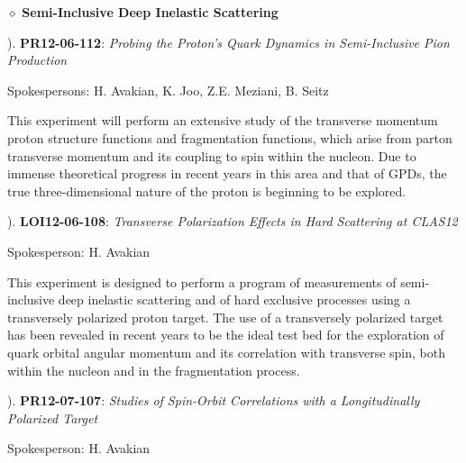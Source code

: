\vskip 0.5cm

\noindent
\begin{large}
$\diamond$ {\bf Semi-Inclusive Deep Inelastic Scattering}
\end{large}

\vskip 0.3cm

\begin{small}
). {\bf PR12-06-112}: {\it Probing the Proton's Quark Dynamics in
Semi-Inclusive Pion Production}

\vskip 0.2cm

\begin{footnotesize}
Spokespersons: H. Avakian, K. Joo, Z.E. Meziani, B. Seitz
\end{footnotesize}

\vskip 0.2cm

This experiment will perform an extensive study of the transverse 
momentum proton structure functions and fragmentation functions, which
arise from parton transverse momentum and its coupling to spin within 
the nucleon.  Due to immense theoretical progress in recent years in 
this area and that of GPDs, the true three-dimensional nature of the 
proton is beginning to be explored.

\vskip 0.3cm

). {\bf LOI12-06-108}: {\it Transverse Polarization Effects in Hard
Scattering at CLAS12}

\vskip 0.2cm

\begin{footnotesize}
Spokesperson: H. Avakian
\end{footnotesize}

\vskip 0.2cm

This experiment is designed to perform a program of measurements of
semi-inclusive deep inelastic scattering and of hard exclusive
processes using a transversely polarized proton target.  The use of
a transversely polarized target has been revealed in recent years to
be the ideal test bed for the exploration of quark orbital angular
momentum and its correlation with transverse spin, both within the
nucleon and in the fragmentation process.

\vskip 0.3cm

). {\bf PR12-07-107}: {\it Studies of Spin-Orbit Correlations with
a Longitudinally Polarized Target}

\vskip 0.2cm

\begin{footnotesize}
Spokesperson: H. Avakian
\end{footnotesize}


\end{small}
